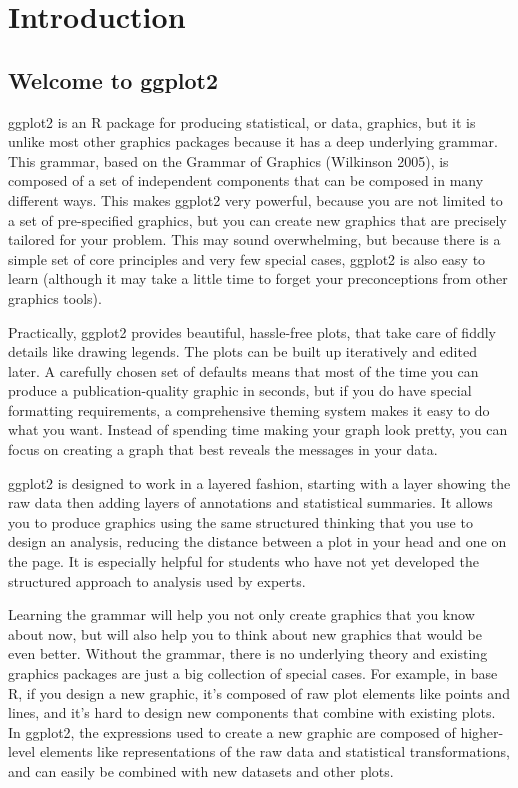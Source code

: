 \chapter{Introduction}

\section{Welcome to ggplot2}

ggplot2 is an R package for producing statistical, or data, graphics,
but it is unlike most other graphics packages because it has a deep
underlying grammar. This grammar, based on the Grammar of Graphics
(Wilkinson 2005), is composed of a set of independent components that
can be composed in many different ways. This makes ggplot2 very
powerful, because you are not limited to a set of pre-specified
graphics, but you can create new graphics that are precisely tailored
for your problem. This may sound overwhelming, but because there is a
simple set of core principles and very few special cases, ggplot2 is
also easy to learn (although it may take a little time to forget your
preconceptions from other graphics tools).

Practically, ggplot2 provides beautiful, hassle-free plots, that take
care of fiddly details like drawing legends. The plots can be built up
iteratively and edited later. A carefully chosen set of defaults means
that most of the time you can produce a publication-quality graphic in
seconds, but if you do have special formatting requirements, a
comprehensive theming system makes it easy to do what you want. Instead
of spending time making your graph look pretty, you can focus on
creating a graph that best reveals the messages in your data.

ggplot2 is designed to work in a layered fashion, starting with a layer
showing the raw data then adding layers of annotations and statistical
summaries. It allows you to produce graphics using the same structured
thinking that you use to design an analysis, reducing the distance
between a plot in your head and one on the page. It is especially
helpful for students who have not yet developed the structured approach
to analysis used by experts.

Learning the grammar will help you not only create graphics that you
know about now, but will also help you to think about new graphics that
would be even better. Without the grammar, there is no underlying theory
and existing graphics packages are just a big collection of special
cases. For example, in base R, if you design a new graphic, it's
composed of raw plot elements like points and lines, and it's hard to
design new components that combine with existing plots. In ggplot2, the
expressions used to create a new graphic are composed of higher-level
elements like representations of the raw data and statistical
transformations, and can easily be combined with new datasets and other
plots.

